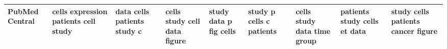 \documentclass[11pt,a4paper]{article}
\begin{document}
\begin{appendices}
\begin{table*}[htb]
\begin{tiny}
\begin{tabular}{|p{}|p{}|p{}|p{}|p{}|p{}|p{}|p{}|p{}|}
    PubMed Central & cells \newline expression \newline patients \newline cell \newline study & data \newline cells \newline patients \newline study \newline c & cells \newline study \newline cell \newline data \newline figure & study \newline data \newline p \newline fig \newline cells & study \newline p \newline cells \newline c \newline patients & cells \newline study \newline data \newline time \newline group & patients \newline study \newline cells \newline et \newline data & study \newline cells \newline patients \newline cancer \newline figure\\\hline

\end{tabular}
\end{tiny}
\end{table*}
\end{appendices}
\end{document}
